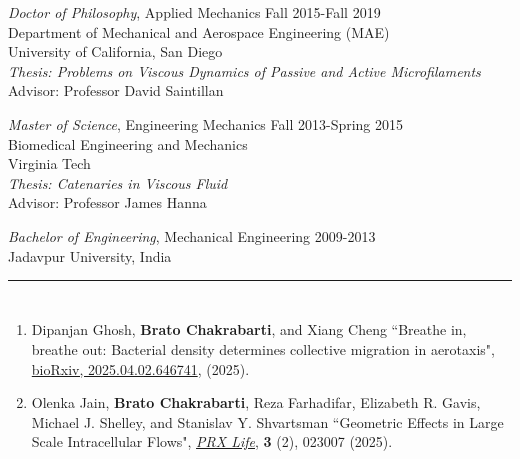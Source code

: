 \documentclass[10pt]{res} %
\begin{document}
\begin{resume}
\vspace*{4mm} %
{\sl Doctor of Philosophy}, 
Applied Mechanics   \hfill Fall 2015-Fall 2019 \\ 
Department of Mechanical and Aerospace Engineering (MAE) \\ 
University of California, San Diego \\
\textit{Thesis: Problems on Viscous Dynamics of Passive and Active Microfilaments} \\
Advisor: Professor David Saintillan 

 
{\sl Master of Science}, Engineering Mechanics \hfill Fall 2013-Spring 2015 \\
Biomedical Engineering and Mechanics \\ 
Virginia Tech \\
\textit{Thesis: Catenaries in Viscous Fluid} \\
Advisor: Professor James Hanna 


{\sl Bachelor of Engineering}, Mechanical Engineering \hfill 2009-2013 \\
Jadavpur University, India 

\vspace*{-3mm}


\noindent\rule{\textwidth}{0.6pt}
\vspace*{-10mm}
\section{}
\vspace*{7mm} %
\begin{enumerate}[topsep=0pt,itemsep= 1ex]
	
\item  Dipanjan Ghosh, \textbf{Brato Chakrabarti}, and Xiang Cheng ``Breathe in, breathe out: Bacterial density determines collective migration in aerotaxis", \href{https://www.biorxiv.org/content/10.1101/2025.04.02.646741v1.abstract}{bioRxiv, 2025.04.02.646741}, (2025).

\item  Olenka Jain, \textbf{Brato Chakrabarti}, Reza Farhadifar, Elizabeth R. Gavis, Michael J. Shelley, and Stanislav Y. Shvartsman ``Geometric Effects in Large Scale Intracellular Flows",  \href{https://doi.org/10.1103/PRXLife.3.023007}{\textit{PRX Life}}, \textbf{3} (2), 023007 (2025). 


\end{enumerate}
\end{resume}
\end{document}
